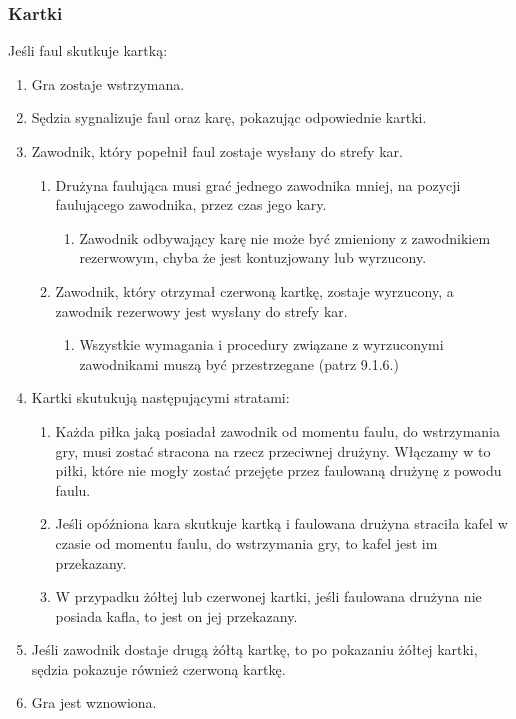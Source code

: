 \documentclass[11pt,a4paper]{article}
\begin{document}
\subsubsection{Kartki}
Jeśli faul skutkuje kartką:
\begin{enumerate}
  \item Gra zostaje wstrzymana.
  \item Sędzia sygnalizuje faul oraz karę, pokazując odpowiednie kartki.
  \item Zawodnik, który popełnił faul zostaje wysłany do strefy kar.
  \begin{enumerate}
    \item Drużyna faulująca musi grać jednego zawodnika mniej, na pozycji faulującego zawodnika, przez czas jego kary.
    \begin{enumerate}
      \item Zawodnik odbywający karę nie może być zmieniony z zawodnikiem rezerwowym, chyba że jest kontuzjowany lub wyrzucony.
    \end{enumerate}
    \item Zawodnik, który otrzymał czerwoną kartkę, zostaje wyrzucony, a zawodnik rezerwowy jest wysłany do strefy kar.
    \begin{enumerate}
      \item Wszystkie wymagania i procedury związane z wyrzuconymi zawodnikami muszą być przestrzegane (patrz 9.1.6.) %
    \end{enumerate}
  \end{enumerate}
  \item Kartki skutukują następującymi stratami:
  \begin{enumerate}
    \item Każda piłka jaką posiadał zawodnik od momentu faulu, do wstrzymania gry, musi zostać stracona na rzecz przeciwnej drużyny. Włączamy w to piłki, które nie mogły zostać przejęte przez faulowaną drużynę z powodu faulu.
    \item Jeśli opóźniona kara skutkuje kartką i faulowana drużyna straciła kafel w czasie od momentu faulu, do wstrzymania gry, to kafel jest im przekazany.
    \item W przypadku żółtej lub czerwonej kartki, jeśli faulowana drużyna nie posiada kafla, to jest on jej przekazany.
  \end{enumerate}
  \item Jeśli zawodnik dostaje drugą żółtą kartkę, to po pokazaniu żółtej kartki, sędzia pokazuje również czerwoną kartkę.
  \item Gra jest wznowiona.
\end{enumerate}
\end{document}
